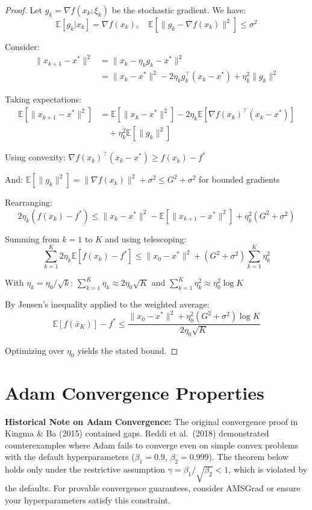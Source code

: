 \documentclass[../main.tex]{subfiles}
\begin{document}
\begin{proof}
Let $g_k = \nabla f(x_k; \xi_k)$ be the stochastic gradient. We have:
\[
\mathbb{E}[g_k | x_k] = \nabla f(x_k), \quad \mathbb{E}[\|g_k - \nabla f(x_k)\|^2] \leq \sigma^2
\]

Consider:
\begin{align}
\|x_{k+1} - x^*\|^2 &= \|x_k - \eta_k g_k - x^*\|^2 \\
&= \|x_k - x^*\|^2 - 2\eta_k g_k^\top(x_k - x^*) + \eta_k^2\|g_k\|^2
\end{align}

Taking expectations:
\begin{align}
\mathbb{E}[\|x_{k+1} - x^*\|^2] &= \mathbb{E}[\|x_k - x^*\|^2] - 2\eta_k\mathbb{E}[\nabla f(x_k)^\top(x_k - x^*)] \\
&\quad + \eta_k^2\mathbb{E}[\|g_k\|^2]
\end{align}

Using convexity: $\nabla f(x_k)^\top(x_k - x^*) \geq f(x_k) - f^*$

And: $\mathbb{E}[\|g_k\|^2] = \|\nabla f(x_k)\|^2 + \sigma^2 \leq G^2 + \sigma^2$ for bounded gradients

Rearranging:
\[
2\eta_k(f(x_k) - f^*) \leq \|x_k - x^*\|^2 - \mathbb{E}[\|x_{k+1} - x^*\|^2] + \eta_k^2(G^2 + \sigma^2)
\]

Summing from $k = 1$ to $K$ and using telescoping:
\[
\sum_{k=1}^K 2\eta_k\mathbb{E}[f(x_k) - f^*] \leq \|x_0 - x^*\|^2 + (G^2 + \sigma^2)\sum_{k=1}^K \eta_k^2
\]

With $\eta_k = \eta_0/\sqrt{k}$: $\sum_{k=1}^K \eta_k \approx 2\eta_0\sqrt{K}$ and $\sum_{k=1}^K \eta_k^2 \approx \eta_0^2 \log K$

By Jensen's inequality applied to the weighted average:
\[
\mathbb{E}[f(\bar{x}_K)] - f^* \leq \frac{\|x_0 - x^*\|^2 + \eta_0^2(G^2 + \sigma^2)\log K}{2\eta_0\sqrt{K}}
\]

Optimizing over $\eta_0$ yields the stated bound.
\end{proof}

\section{Adam Convergence Properties}\label{sec:proof-adam-convergence}

\begin{important}
\textbf{Historical Note on Adam Convergence:} The original convergence proof in Kingma \& Ba (2015) contained gaps. Reddi et al.\ (2018) demonstrated counterexamples where Adam fails to converge even on simple convex problems with the default hyperparameters ($\beta_1 = 0.9$, $\beta_2 = 0.999$). The theorem below holds only under the restrictive assumption $\gamma = \beta_1/\sqrt{\beta_2} < 1$, which is violated by the defaults. For provable convergence guarantees, consider AMSGrad or ensure your hyperparameters satisfy this constraint.
\end{important}
\end{document}
